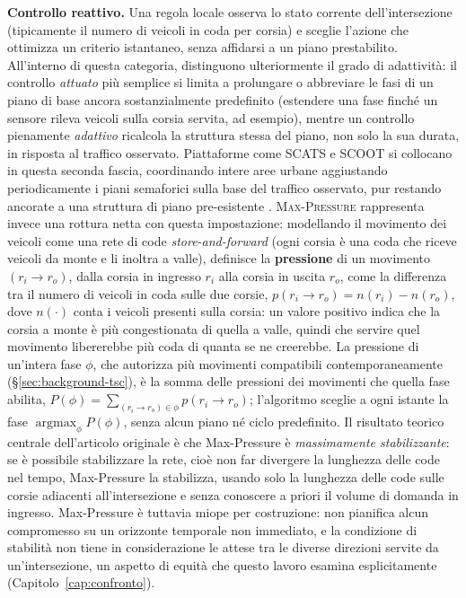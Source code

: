 \textbf{Controllo reattivo.} Una regola locale osserva lo stato corrente
dell'intersezione (tipicamente il numero di veicoli in coda per corsia) e
sceglie l'azione che ottimizza un criterio istantaneo, senza affidarsi a
un piano prestabilito. All'interno di questa categoria,
\citet{shams2018atsctaxonomy} distinguono ulteriormente il grado di
adattività: il controllo \emph{attuato} più semplice si limita a
prolungare o abbreviare le fasi di un piano di base ancora sostanzialmente
predefinito (estendere una fase finché un sensore rileva veicoli sulla
corsia servita, ad esempio), mentre un controllo pienamente
\emph{adattivo} ricalcola la struttura stessa del piano, non solo la sua
durata, in risposta al traffico osservato. Piattaforme come SCATS e SCOOT
si collocano in questa seconda fascia, coordinando intere aree urbane
aggiustando periodicamente i piani semaforici sulla base del traffico
osservato, pur restando ancorate a una struttura di piano pre-esistente
\citep{wei2020tscsurvey}. \textsc{Max-Pressure}
\citep{varaiya2013maxpressure} rappresenta invece una rottura netta con
questa impostazione: modellando il movimento dei veicoli come una rete di
code \emph{store-and-forward} (ogni corsia è una coda che riceve veicoli
da monte e li inoltra a valle), definisce la \textbf{pressione} di un
movimento $(r_i \to r_o)$, dalla corsia in ingresso $r_i$ alla corsia in
uscita $r_o$, come la differenza tra il numero di veicoli in coda sulle
due corsie, $p(r_i \to r_o) = n(r_i) - n(r_o)$, dove $n(\cdot)$ conta i
veicoli presenti sulla corsia: un valore positivo indica che la corsia a
monte è più congestionata di quella a valle, quindi che servire quel
movimento libererebbe più coda di quanta se ne creerebbe. La pressione di
un'intera fase $\phi$, che autorizza più movimenti compatibili
contemporaneamente (§\ref{sec:background-tsc}), è la somma delle pressioni
dei movimenti che quella fase abilita, $P(\phi) = \sum_{(r_i \to r_o) \in
\phi} p(r_i \to r_o)$; l'algoritmo sceglie a ogni istante la fase
$\operatorname*{argmax}_\phi P(\phi)$, senza alcun piano né ciclo
predefinito. Il risultato teorico
centrale dell'articolo originale è che Max-Pressure è \emph{massimamente
stabilizzante}: se è possibile stabilizzare la rete, cioè non far
divergere la lunghezza delle code nel tempo, Max-Pressure la stabilizza,
usando solo la lunghezza delle code sulle corsie adiacenti
all'intersezione e senza conoscere a priori il volume di domanda in
ingresso. Max-Pressure è tuttavia miope per costruzione: non pianifica
alcun compromesso su un orizzonte temporale non immediato, e la condizione
di stabilità non tiene in considerazione le attese tra le diverse
direzioni servite da un'intersezione, un aspetto di equità che questo
lavoro esamina esplicitamente (Capitolo~\ref{cap:confronto}).

